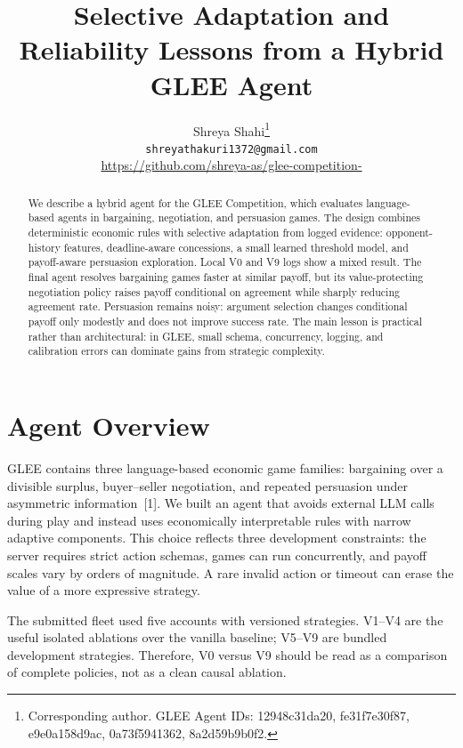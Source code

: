 \documentclass{article}
\title{Selective Adaptation and Reliability Lessons from a Hybrid GLEE Agent}
\author{%
Shreya Shahi\thanks{Corresponding author. GLEE Agent IDs: 12948c31da20, fe31f7e30f87, e9e0a158d9ac, 0a73f5941362, 8a2d59b9b0f2.} \\
\texttt{shreyathakuri1372@gmail.com} \\
\url{https://github.com/shreya-as/glee-competition-}
}
\begin{document}
\maketitle

\begin{abstract}
We describe a hybrid agent for the GLEE Competition, which evaluates language-based agents in bargaining, negotiation, and persuasion games. The design combines deterministic economic rules with selective adaptation from logged evidence: opponent-history features, deadline-aware concessions, a small learned threshold model, and payoff-aware persuasion exploration. Local V0 and V9 logs show a mixed result. The final agent resolves bargaining games faster at similar payoff, but its value-protecting negotiation policy raises payoff conditional on agreement while sharply reducing agreement rate. Persuasion remains noisy: argument selection changes conditional payoff only modestly and does not improve success rate. The main lesson is practical rather than architectural: in GLEE, small schema, concurrency, logging, and calibration errors can dominate gains from strategic complexity.
\end{abstract}

\section{Agent Overview}

GLEE contains three language-based economic game families: bargaining over a divisible surplus, buyer--seller negotiation, and repeated persuasion under asymmetric information~[1]. We built an agent that avoids external LLM calls during play and instead uses economically interpretable rules with narrow adaptive components. This choice reflects three development constraints: the server requires strict action schemas, games can run concurrently, and payoff scales vary by orders of magnitude. A rare invalid action or timeout can erase the value of a more expressive strategy.

The submitted fleet used five accounts with versioned strategies. V1--V4 are the useful isolated ablations over the vanilla baseline; V5--V9 are bundled development strategies. Therefore, V0 versus V9 should be read as a comparison of complete policies, not as a clean causal ablation.
\end{document}
